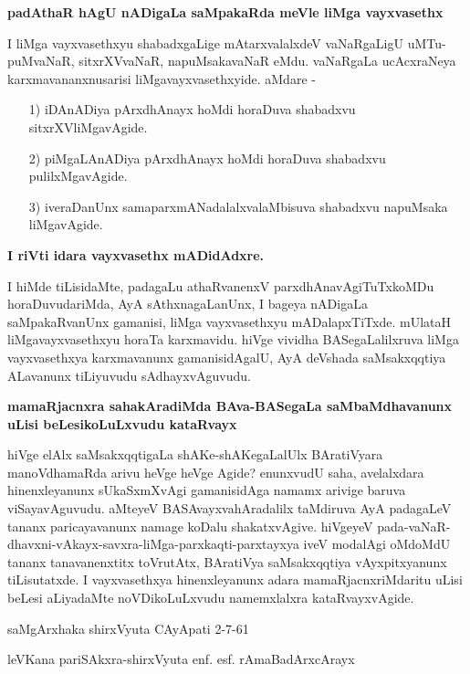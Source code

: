 {\bigskip
\noindent
{\large\bf padAthaR hAgU nADigaLa saMpakaRda meVle liMga vayxvasethx}}\label{page18}
\medskip

\noindent
I liMga vayxvasethxyu shabadxgaLige mAtarxvalalxdeV vaNaRgaLigU uMTu-\-puMvaNaR, sitxrXVvaNaR, napuM\-saka\-vaNaR eMdu. vaNaRgaLa ucAcxraNeya karxmavananxnusarisi liMgavayxvasethxyide. aMdare -
\begin{itemize}
\item[1)] iDAnADiya pArxdhAnayx hoMdi horaDuva shabadxvu sitxrXVliMgavAgide.

\item[2)] piMgaLAnADiya pArxdhAnayx hoMdi horaDuva shabadxvu pulilxMgavAgide.

\item[3)] iveraDanUnx samaparxmANadalalxvalaMbisuva shabadxvu napuMsaka liMgavAgide.
\end{itemize}

\newpage%

{\medskip
\noindent
{\large\bf I riVti idara vayxvasethx mADidAdxre.}}
\medskip

\noindent
I hiMde tiLisidaMte, padagaLu athaRvanenxV parxdhAnavAgiTuTxkoMDu horaDu\-vudariMda, AyA sAthxna\-gaLanUnx, I bageya nADigaLa saMpakaRvanUnx gamanisi, liMga vayxvasethxyu mADalapxTiTxde. mUlataH liMgavayxvasethxyu horaTa karxmavidu. hiVge vividha BASegaLalilxruva liMga vayxvasethxya karxmavanunx gamanisi\-dAgalU, AyA deVshada saMsakxqqtiya ALavanunx tiLiyuvudu sAdhayxvAguvudu.

{\bigskip
\noindent
{\large\bf  mamaRjacnxra sahakAradiMda BAva-BASegaLa saMbaMdhavanunx uLisi beLesi\-koLuLxvudu kataRvayx}}\label{page18}
\medskip

hiVge elAlx saMsakxqqtigaLa shAKe-shAKegaLalUlx BAratiVyara manoVdhamaRda arivu heVge heVge A\-gide? enunxvudU saha, avelalxdara hinenxleyanunx sUkaSxmXvAgi gamanisidAga namamx ari\-vige \-baruva viSaya\-vAguvudu. aMteyeV BASAvayxva\-hAradalilx taMdiruva AyA padagaLeV tananx pari\-caya\-vanunx namage koDalu shakatxvAgive. hiVgeyeV pada-vaNaR-dhavxni-vAkayx-savxra-liMga-parxkaqti-parxtayxya iveV moda\-lAgi oMdoMdU tananx tanavanenxtitx toVrutAtx, BAratiVya saMsakxqqtiya vAyxpitxyanunx tiLisutatxde. I vayxva\-sethxya hinenxleyanunx adara mamaRjacnxriMdaritu uLisi beLesi aLiyadaMte noVDikoLuLxvudu namemx\-lalxra kataRvayx\-vAgide.

\vskip 1cm

saMgArxhaka shirxVyuta CAyApati 2-7-61

\medskip

leVKana pariSAkxra-shirxVyuta enf. esf. rAmaBadArxcArayx
